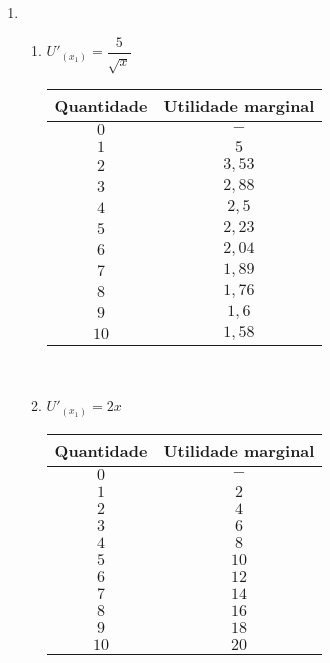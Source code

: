 \documentclass[a4paper, 12pt]{article}
\begin{document}
\begin{enumerate}
	\newpage

	\item
	\begin{enumerate}
		\item $U'_{(x_1)} = \dfrac{5}{\sqrt{x}}$\\
		\begin{table}[H]
			\begin{tabular}{|c|c|}
				\hline
				Quantidade & Utilidade marginal \\ \hline
				$0$ & $-$\\ \hline
				$1$ & $5$\\ \hline
				$2$ & $3,53$\\ \hline
				$3$ & $2,88$\\ \hline
				$4$ & $2,5$\\ \hline
				$5$ & $2,23$\\ \hline
				$6$ & $2,04$\\ \hline
				$7$ & $1,89$\\ \hline
				$8$ & $1,76$\\ \hline
				$9$ & $1,6$\\ \hline
				$10$ & $1,58$\\ \hline
			\end{tabular}
		\end{table}\\
		
		\item $U'_{(x_1)} = 2x$\\
		\begin{table}[H]
			\begin{tabular}{|c|c|}
				\hline
				Quantidade & Utilidade marginal \\ \hline
				$0$ & $-$\\ \hline
				$1$ & $2$\\ \hline
				$2$ & $4$\\ \hline
				$3$ & $6$\\ \hline
				$4$ & $8$\\ \hline
				$5$ & $10$\\ \hline
				$6$ & $12$\\ \hline
				$7$ & $14$\\ \hline
				$8$ & $16$\\ \hline
				$9$ & $18$\\ \hline
				$10$ & $20$\\ \hline
			\end{tabular}
		\end{table}\\
	

\end{enumerate}
\end{enumerate}
\end{document}
